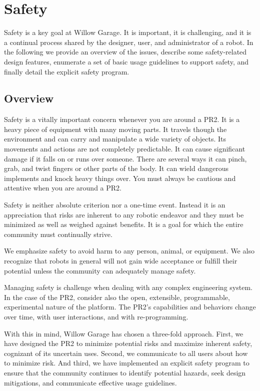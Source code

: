 
\chapter{Safety}

Safety is a key goal at Willow Garage.  It is important, it is challenging, and it is a continual process shared by the designer, user, and administrator of a robot.  In the following we provide an overview of the issues, describe some safety-related design features, enumerate a set of basic usage guidelines to support safety, and finally detail the explicit safety program.

\section{Overview}

Safety is a vitally important concern whenever you are around a PR2. It is a heavy piece of equipment with many moving parts. It travels though the environment and can carry and manipulate a wide variety of objects. Its movements and actions are not completely predictable. It can cause significant damage if it falls on or runs over someone. There are several ways it can pinch, grab, and twist fingers or other parts of the body. It can wield dangerous implements and knock heavy things over. You must always be cautious and attentive when you are around a PR2.

Safety is neither absolute criterion nor a one-time event.  Instead it is an appreciation that risks are inherent to any robotic endeavor and they must be minimized as well as weighed against benefits.  It is a goal for which the entire community must continually strive.

We emphasize safety to avoid harm to any person, animal, or equipment.  We also recognize that robots in general will not gain wide acceptance or fulfill their potential unless the community can adequately manage safety.

Managing safety is challenge when dealing with any complex engineering system.  In the case of the PR2, consider also the open, extensible, programmable, experimental nature of the platform.  The PR2's capabilities and behaviors change over time, with user interactions, and with re-programming.

With this in mind, Willow Garage has chosen a three-fold approach.  First, we have designed the PR2 to minimize potential risks and maximize inherent safety, cognizant of its uncertain uses.  Second, we communicate to all users about how to minimize risk. And third, we have implemented an explicit safety program to ensure that the community continues to identify potential hazards, seek design mitigations, and communicate effective usage guidelines.

